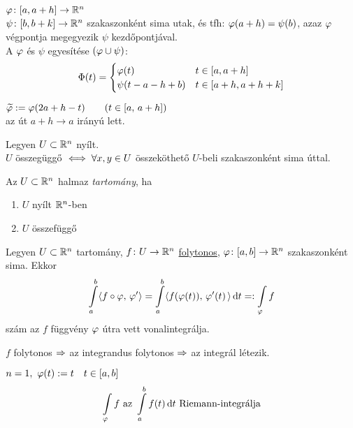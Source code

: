 \begin{de}
  $\varphi\colon [a,a+h]\to\mathbb{R}^n$\\$\psi\colon[b,b+k]\to\mathbb{R}^n$ szakaszonként sima utak, és tfh: $\varphi(a+h)=\psi(b)$, azaz
  $\varphi$ végpontja megegyezik $\psi$ kezdőpontjával. \\
  A $\varphi$ és $\psi$ egyesítése $(\varphi\cup\psi)$:
\[\Phi(t) = \begin{cases}\varphi(t) & t\in[a,a+h]\\\psi(t-a-h+b) & t\in[a+h,a+h+k]\end{cases}\]
\end{de}

\begin{de} $\widetilde{\varphi} := \varphi(2a+h-t)\qquad(t\in[a,\,a+h])$\\
  az út $a+h\to a$ irányú lett.
\end{de}

\begin{te}Legyen $U\subset \mathbb{R}^n$ nyílt.\\
  $U$ összegüggő $\iff \forall x,y\in  U$ összeköthető $U$-beli szakaszonként
  sima úttal.
\end{te}

\begin{de}[Tartomány]Az $U\subset \mathbb{R}^n$ halmaz \emph{tartomány}, ha
{\listazjromai
  \begin{enumerate}
    \item $U$ nyílt $\mathbb{R}^n$-ben
    \item $U$ összefüggő
  \end{enumerate}
}
\end{de}
\begin{de}
  Legyen $U\subset \mathbb{R}^n$ tartomány, $f\colon U\to\mathbb{R}^n$ \underline{folytonos}, $\varphi\colon [a,b]\to\mathbb{R}^n$ szakaszonként
  sima. Ekkor
\[\Int_a^b\skalar{f\circ\vfi}{\vfi'} = \Int_a^b\skalar{f(\vfi(t))}{\vfi'(t)\,}\diff t =: \Int_\vfi f\]
szám az $f$ függvény $\varphi$ útra vett vonalintegrálja.
\end{de}
\begin{Megj}
  \item $f$ folytonos $\Rightarrow$ az integrandus folytonos $\Rightarrow$ az integrál létezik.
\item $n=1,\ \varphi(t) := t\quad t\in[a,b]$
\[\Int_\vfi f \text{ az } \Int_a^bf(t)\diff t \text{ Riemann-integrálja}\]
\end{Megj}

